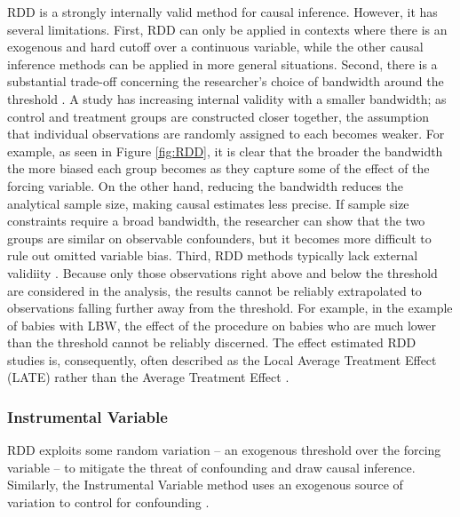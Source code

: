 \documentclass[12pt]{article}
\begin{document}
RDD is a strongly internally valid method for causal inference. However, it has several limitations. First, RDD can only be applied in contexts where there is an exogenous and hard cutoff over a continuous variable, while the other causal inference methods can be applied in more general situations. Second, there is a substantial trade-off concerning the researcher's choice of bandwidth around the threshold \citep{borRegressionDiscontinuityDesigns2014}. A study has increasing internal validity with a smaller bandwidth; as control and treatment groups are constructed closer together, the assumption that individual observations are randomly assigned to each becomes weaker. For example, as seen in Figure \ref{fig:RDD}, it is clear that the broader the bandwidth the more biased each group becomes as they capture some of the effect of the forcing variable. On the other hand, reducing the bandwidth reduces the analytical sample size, making causal estimates less precise. If sample size constraints require a broad bandwidth, the researcher can show that the two groups are similar on observable confounders, but it becomes more difficult to rule out omitted variable bias. Third, RDD methods typically lack external validiity \citep{venkataramaniRegressionDiscontinuityDesigns2016}. Because only those observations right above and below the threshold are considered in the analysis, the results cannot be reliably extrapolated to observations falling further away from the threshold. For example, in the example of babies with LBW, the effect of the procedure on babies who are much lower than the threshold cannot be reliably discerned. The effect estimated RDD studies is, consequently, often described as the Local Average Treatment Effect (LATE) rather than the Average Treatment Effect \citep{gertlerImpactEvaluationPractice2010}.


\subsubsection{Instrumental Variable}

RDD exploits some random variation -- an exogenous threshold over the forcing variable -- to mitigate the threat of confounding and draw causal inference. Similarly, the Instrumental Variable method uses an exogenous source of variation to control for confounding \citep{angristInstrumentalVariablesSearch2001}.
\end{document}
